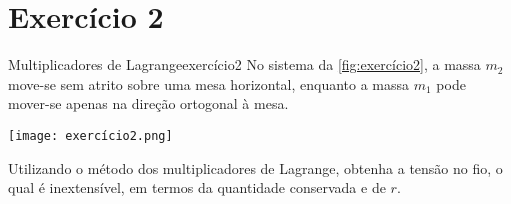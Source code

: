\section*{Exercício 2}
\begin{exercício}{Multiplicadores de Lagrange}{exercício2}
    No sistema da \cref{fig:exercício2}, a massa \(m_2\) move-se sem atrito sobre uma mesa horizontal, enquanto a massa \(m_1\) pode mover-se apenas na direção ortogonal à mesa.

    \begin{center}
        \texttt{[image: exercício2.png]}
    \end{center}

    Utilizando o método dos multiplicadores de Lagrange, obtenha a tensão no fio, o qual é inextensível, em termos da quantidade conservada e de \(r\).
\end{exercício}
